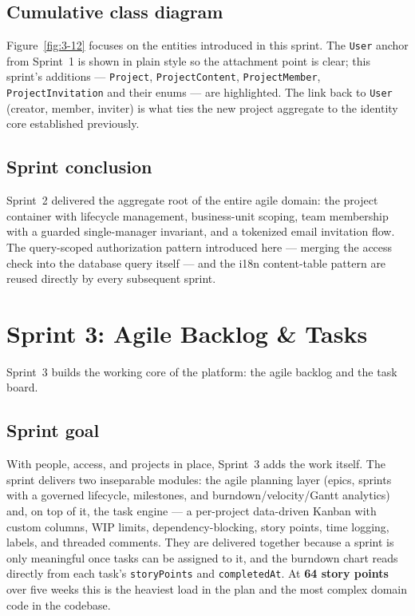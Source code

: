 \subsection{Cumulative class diagram}

Figure~\ref{fig:3-12} focuses on the entities introduced in this sprint. The \texttt{User} anchor
from Sprint~1 is shown in plain style so the attachment point is clear; this sprint's additions ---
\texttt{Project}, \texttt{ProjectContent}, \texttt{ProjectMember}, \texttt{ProjectInvitation} and
their enums --- are highlighted. The link back to \texttt{User} (creator, member, inviter) is
what ties the new project aggregate to the identity core established previously.

{\renewcommand{\figmaxheight}{0.82\textheight}%
}

\subsection{Sprint conclusion}

Sprint~2 delivered the aggregate root of the entire agile domain: the project container with
lifecycle management, business-unit scoping, team membership with a guarded single-manager
invariant, and a tokenized email invitation flow. The query-scoped authorization pattern
introduced here --- merging the access check into the database query itself --- and the i18n
content-table pattern are reused directly by every subsequent sprint.

\clearpage
\section{Sprint 3: Agile Backlog \& Tasks}

Sprint~3 builds the working core of the platform: the agile backlog and the task board.

\subsection{Sprint goal}

With people, access, and projects in place, Sprint~3 adds the work itself. The sprint delivers
two inseparable modules: the agile planning layer (epics, sprints with a governed lifecycle,
milestones, and burndown/velocity/Gantt analytics) and, on top of it, the task engine --- a
per-project data-driven Kanban with custom columns, WIP limits, dependency-blocking, story
points, time logging, labels, and threaded comments. They are delivered together because a
sprint is only meaningful once tasks can be assigned to it, and the burndown chart reads
directly from each task's \texttt{storyPoints} and \texttt{completedAt}. At \textbf{64 story
points} over five weeks this is the heaviest load in the plan and the most complex domain code
in the codebase.

